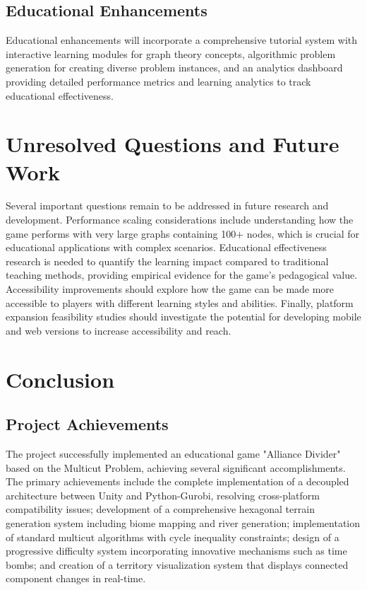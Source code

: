 \documentclass[english]{tudscrreprt}
\begin{document}
\subsection{Educational Enhancements}
Educational enhancements will incorporate a comprehensive tutorial system with interactive learning modules for graph theory concepts, algorithmic problem generation for creating diverse problem instances, and an analytics dashboard providing detailed performance metrics and learning analytics to track educational effectiveness.

\section{Unresolved Questions and Future Work}
Several important questions remain to be addressed in future research and development. Performance scaling considerations include understanding how the game performs with very large graphs containing 100+ nodes, which is crucial for educational applications with complex scenarios. Educational effectiveness research is needed to quantify the learning impact compared to traditional teaching methods, providing empirical evidence for the game's pedagogical value. Accessibility improvements should explore how the game can be made more accessible to players with different learning styles and abilities. Finally, platform expansion feasibility studies should investigate the potential for developing mobile and web versions to increase accessibility and reach.

\section{Conclusion}

\subsection{Project Achievements}
The project successfully implemented an educational game "Alliance Divider" based on the Multicut Problem, achieving several significant accomplishments. The primary achievements include the complete implementation of a decoupled architecture between Unity and Python-Gurobi, resolving cross-platform compatibility issues; development of a comprehensive hexagonal terrain generation system including biome mapping and river generation; implementation of standard multicut algorithms with cycle inequality constraints; design of a progressive difficulty system incorporating innovative mechanisms such as time bombs; and creation of a territory visualization system that displays connected component changes in real-time.
\end{document}
